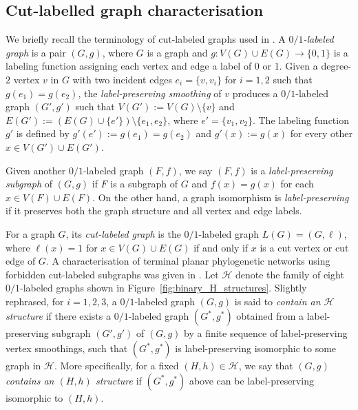 \documentclass[pdflatex,sn-mathphys-num]{sn-jnl}
\theoremstyle{thmstyleone}%
\theoremstyle{thmstyletwo}%
\theoremstyle{thmstylethree}%
\begin{document}
\begin{appendices}


\section{Cut-labelled graph characterisation}\label{secA1}



We briefly recall the terminology of cut-labeled graphs used in
\cite{Miyaji2026}. A \emph{$0/1$-labeled graph} is a pair $(G,g)$,
where $G$ is a graph and $g:V(G)\cup E(G)\to \{0,1\}$ is a labeling function assigning each vertex and edge a label of 0 or 1.
Given a degree-$2$ vertex $v$ in $G$ with two incident edges $e_i=\{v,v_i\}$ for $i=1,2$ such that $g(e_1)=g(e_2)$, the \emph{label-preserving smoothing} of $v$ produces a $0/1$-labeled graph $(G',g')$ such that $V(G'):=V(G)\setminus \{v\}$ and $E(G'):=(E(G)\cup \{e'\})\setminus \{e_1,e_2\}$, where $e'=\{v_1,v_2\}$. The labeling function $g'$ is defined by $g'(e'):=g(e_1)=g(e_2)$ and $g'(x):=g(x)$ for every other $x\in V(G')\cup E(G')$.


Given another $0/1$-labeled graph $(F,f)$, we say $(F,f)$ is a \emph{label-preserving subgraph} of $(G,g)$ if $F$ is a subgraph of $G$ and $f(x)=g(x)$ for each $x\in V(F)\cup E(F)$. On the other hand, a graph isomorphism is \emph{label-preserving} if it preserves
both the graph structure and all vertex and edge labels.




For a graph $G$, its \emph{cut-labeled graph} is the
$0/1$-labeled graph $L(G)=(G,\ell)$, where $\ell(x)=1$ for $x \in V(G)\cup E(G)$ if and only if $x$ is a cut vertex or cut edge of $G$. 
A characterisation of terminal planar phylogenetic networks using forbidden cut-labeled subgraphs was given in \cite{Miyaji2026}. 
Let $\mathcal H$ denote the family of eight $0/1$-labeled graphs shown in Figure~\ref{fig:binary_H_structures}. 
Slightly rephrased, for $i=1,2,3$,
a $0/1$-labeled graph $(G,g)$ is said to \emph{contain an $\mathcal H$ structure} if there exists a $0/1$-labeled graph $(G^*,g^*)$ obtained from a label-preserving subgraph $(G',g')$ of $(G,g)$ by a finite sequence of label-preserving vertex smoothings, such that $(G^*,g^*)$ is label-preserving isomorphic to some graph in $\mathcal H$. More specifically, for a fixed $(H,h)\in\mathcal H$, we say that $(G,g)$ \emph{contains an $(H,h)$ structure} if $(G^*,g^*)$ above can be label-preserving isomorphic to $(H,h)$.




\end{appendices}
\end{document}
